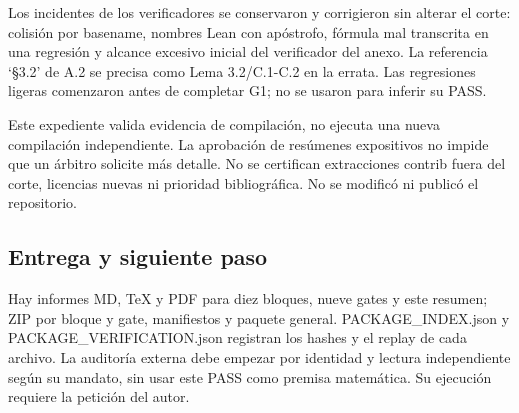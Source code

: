 Los incidentes de los verificadores se conservaron y corrigieron sin
alterar el corte: colisión por basename, nombres Lean con apóstrofo,
fórmula mal transcrita en una regresión y alcance excesivo inicial del
verificador del anexo. La referencia `§3.2' de A.2 se precisa como Lema
3.2/C.1-C.2 en la errata. Las regresiones ligeras comenzaron antes de
completar G1; no se usaron para inferir su PASS.

Este expediente valida evidencia de compilación, no ejecuta una nueva
compilación independiente. La aprobación de resúmenes expositivos no
impide que un árbitro solicite más detalle. No se certifican
extracciones contrib fuera del corte, licencias nuevas ni prioridad
bibliográfica. No se modificó ni publicó el repositorio.

\subsection{Entrega y siguiente paso}\label{entrega-y-siguiente-paso}

Hay informes MD, TeX y PDF para diez bloques, nueve gates y este
resumen; ZIP por bloque y gate, manifiestos y paquete general.
PACKAGE\_INDEX.json y PACKAGE\_VERIFICATION.json registran los hashes y
el replay de cada archivo. La auditoría externa debe empezar por
identidad y lectura independiente según su mandato, sin usar este PASS
como premisa matemática. Su ejecución requiere la petición del autor.
